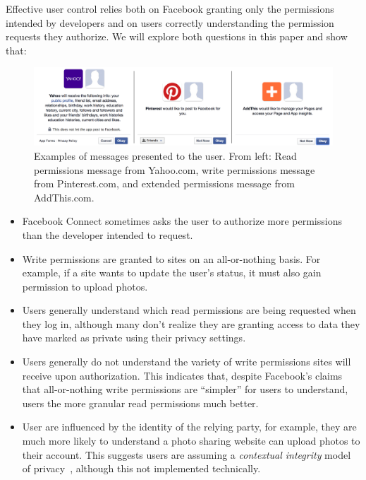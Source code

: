 \documentclass[10pt]{sig-alternate-10pt}
\begin{document}
Effective user control relies both on Facebook granting only the permissions intended by developers and on users correctly understanding the permission requests they authorize.
We will explore both questions in this paper and show that:

\begin{figure}[htbp]
  \centering
  \includegraphics[width=16.5cm]{message_example}
  \caption{Examples of messages presented to the user. From left: Read permissions message from Yahoo.com, write permissions message from Pinterest.com, and extended permissions message from AddThis.com.}
  \label{figure:messageexample}
\end{figure}



\begin{itemize}
  \item Facebook Connect sometimes asks the user to authorize more permissions than the developer intended to request.
  \item Write permissions are granted to sites on an all-or-nothing basis. For example, if a site wants to update the user's status, it must also gain permission to upload photos.
  \item Users generally understand which read permissions are being requested when they log in, although many don't realize they are granting access to data they have marked as private using their privacy settings.
  \item Users generally do not understand the variety of write permissions sites will receive upon authorization. This indicates that, despite Facebook's claims that all-or-nothing write permissions are ``simpler'' for users to understand, users the more granular read permissions much better.
  \item  User are influenced by the identity of the relying party, for example, they are much more likely to understand a photo sharing website can upload photos to their account. This suggests users are assuming a \textit{contextual integrity} model of privacy~\cite{contextual-integrity}, although this not implemented technically.
\end{itemize}
\end{document}
